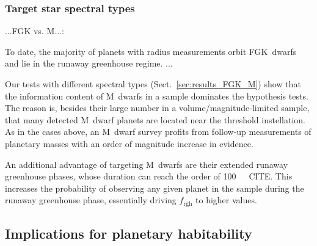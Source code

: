 \documentclass[twocolumn]{aastex631}
\begin{document}
\subsubsection{Target star spectral types}
\begin{note}
    ...FGK vs. M...:

To date, the majority of planets with radius measurements orbit FGK~dwarfs and lie in the runaway greenhouse regime.
    ...

    Our tests with different spectral types (Sect.~\ref{sec:results_FGK_M}) show that the information content of M~dwarfs in a sample dominates the hypothesis tests.
The reason is, besides their large number in a volume/magnitude-limited sample, that many detected M~dwarf planets are located near the threshold instellation.
As in the cases above, an M~dwarf survey profits from follow-up measurements of planetary masses with an order of magnitude increase in evidence.

    An additional advantage of targeting M~dwarfs are their extended runaway greenhouse phases, whose duration can reach the order of \SI{100}{\mega\year}~CITE.
    This increases the probability of observing any given planet in the sample during the runaway greenhouse phase, essentially driving $f_\mathrm{rgh}$ to higher values.
\end{note}

\subsection{Implications for planetary habitability}\label{sec:habitability}
\end{document}
